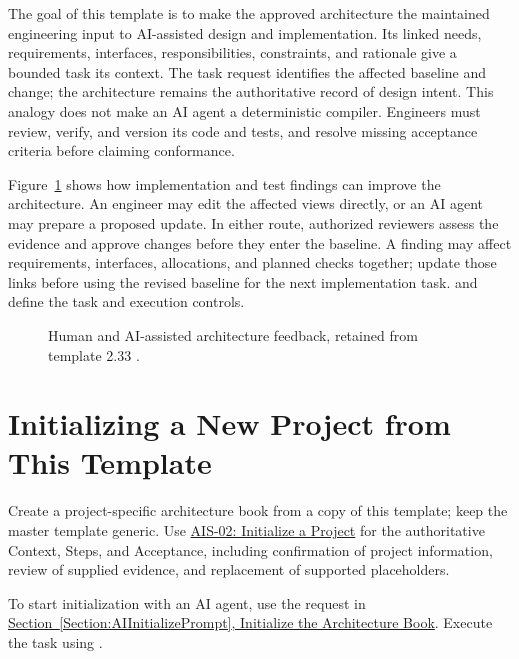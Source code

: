 The goal of this template is to make the approved architecture the maintained
engineering input to AI-assisted design and implementation. Its linked needs,
requirements, interfaces, responsibilities, constraints, and rationale give a
bounded task its context. The task request identifies the affected baseline and
change; the architecture remains the authoritative record of design intent.
This analogy does not make an AI agent a deterministic compiler. Engineers must
review, verify, and version its code and tests, and resolve missing acceptance
criteria before claiming conformance.

Figure~\ref{Figure:ArchitectureUpdateFeedback} shows how implementation and
test findings can improve the architecture. An engineer may edit the affected
views directly, or an AI agent may prepare a proposed update. In either route,
authorized reviewers assess the evidence and approve changes before they enter
the baseline. A finding may affect requirements, interfaces, allocations, and
planned checks together; update those links before using the revised baseline
for the next implementation task.  and
 define the task and execution controls.

\begin{figure}[htbp]
\centering
\resizebox{\textwidth}{!}{}
\caption{Human and AI-assisted architecture feedback, retained from template 2.33 \cite{ArchitectureDesignTemplate233}.}
\label{Figure:ArchitectureUpdateFeedback}
\end{figure}

\section{Initializing a New Project from This Template}
\label{Section:InitializeNewProject}
Create a project-specific architecture book from a copy of this template;
keep the master template generic. Use
\hyperref[Skill:AIS-02]{AIS-02: Initialize a Project} for the authoritative
Context, Steps, and Acceptance, including confirmation of project information,
review of supplied evidence, and replacement of supported placeholders.

To start initialization with an AI agent, use the request in
\hyperref[Section:AIInitializePrompt]{Section~\ref{Section:AIInitializePrompt},
Initialize the Architecture Book}. Execute the task using
.

